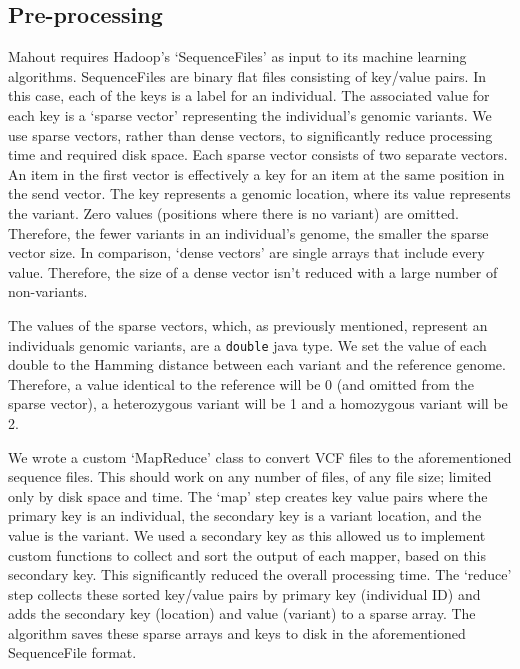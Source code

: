 \documentclass{bioinfo}
\begin{document}
\begin{methods}
\subsection*{Pre-processing}
\label{Sec:preprocessing}
Mahout requires Hadoop's `SequenceFiles' as input to its machine learning algorithms. SequenceFiles are binary flat files consisting of key/value pairs. In this case, each of the keys is a
label for an individual. The associated value for each key is a `sparse vector' representing the individual's genomic variants. We use sparse vectors, rather than
dense vectors, to significantly reduce processing time and required disk space. Each sparse vector consists of two separate vectors. An item in the first vector is
effectively a key for an item at the same position in the send vector. The key represents a genomic location, where its value represents the variant. Zero values (positions where there is no variant)
are omitted. Therefore, the fewer variants in an individual's genome, the smaller the sparse vector size. In comparison, `dense vectors' are single arrays that
include every value. Therefore, the size of a dense vector isn't reduced with a large number of non-variants.

The values of the sparse vectors, which, as previously mentioned, represent an individuals genomic variants, are a \texttt{double} java type.
We set the value of each double to the Hamming distance between each variant and the reference genome. Therefore, a value identical to the reference will be 0 (and omitted from the sparse vector),
a heterozygous variant will be 1 and a homozygous variant will be 2.

We wrote a custom `MapReduce' class to convert VCF files to the aforementioned sequence files. This should work on any number of files,
of any file size; limited only by disk space and time. The `map' step creates key value pairs where the primary key is an individual, the secondary key is a variant location, and the value is the variant.
We used a secondary key as this allowed us to implement custom functions to collect and sort the output of each mapper, based on this secondary key. This significantly reduced
the overall processing time. The `reduce' step collects these sorted key/value pairs by primary key (individual ID) and adds the secondary key (location) and value (variant) to a sparse array. The algorithm
saves these sparse arrays and keys to disk in the aforementioned SequenceFile format.   



\end{methods}
\end{document}
